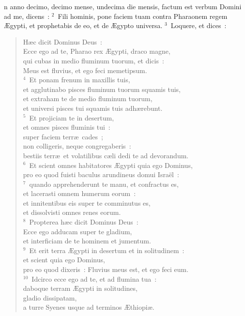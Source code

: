 \bchapter
{}n anno decimo, decimo mense, undecima die mensis, factum est verbum Domini ad me, dicens~:
${}^{2}$~Fili hominis, pone faciem tuam contra Pharaonem regem \AE gypti, et prophetabis de eo, et de \AE gypto universa.
${}^{3}$~Loquere, et dices~: \begin{verse}H\ae c dicit Dominus Deus~:\\ Ecce ego ad te, Pharao rex \AE gypti, draco magne,\\ qui cubas in medio fluminum tuorum, et dicis~:\\ Meus est fluvius, et ego feci memetipsum.\\
${}^{4}$~Et ponam frenum in maxillis tuis,\\ et agglutinabo pisces fluminum tuorum squamis tuis,\\ et extraham te de medio fluminum tuorum,\\ et universi pisces tui squamis tuis adh\ae rebunt.\\
${}^{5}$~Et projiciam te in desertum,\\ et omnes pisces fluminis tui~:\\ super faciem terr\ae\ cades~;\\ non colligeris, neque congregaberis~:\\ bestiis terr\ae\ et volatilibus c\ae li dedi te ad devorandum.\\
${}^{6}$~Et scient omnes habitatores \AE gypti quia ego Dominus,\\ pro eo quod fuisti baculus arundineus domui Isra\"el~:\\
${}^{7}$~quando apprehenderunt te manu, et confractus es,\\ et lacerasti omnem humerum eorum~:\\ et innitentibus eis super te comminutus es,\\ et dissolvisti omnes renes eorum.\\
${}^{8}$~Propterea h\ae c dicit Dominus Deus~:\\ Ecce ego adducam super te gladium,\\ et interficiam de te hominem et jumentum.\\
${}^{9}$~Et erit terra \AE gypti in desertum et in solitudinem~:\\ et scient quia ego Dominus,\\ pro eo quod dixeris~: Fluvius meus est, et ego feci eum.\\
${}^{10}$~Idcirco ecce ego ad te, et ad flumina tua~:\\ daboque terram \AE gypti in solitudines,\\ gladio dissipatam,\\ a turre Syenes usque ad terminos \AE thiopi\ae .\\

\end{verse}
